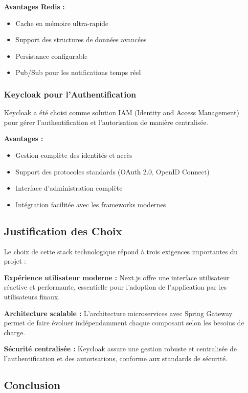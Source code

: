 \textbf{Avantages Redis :}
\begin{itemize}
    \item Cache en mémoire ultra-rapide
    \item Support des structures de données avancées
    \item Persistance configurable
    \item Pub/Sub pour les notifications temps réel
\end{itemize}

\subsubsection{Keycloak pour l'Authentification}

Keycloak a été choisi comme solution IAM (Identity and Access Management) pour gérer l'authentification et l'autorisation de manière centralisée.

\textbf{Avantages :}
\begin{itemize}
    \item Gestion complète des identités et accès
    \item Support des protocoles standards (OAuth 2.0, OpenID Connect)
    \item Interface d'administration complète
    \item Intégration facilitée avec les frameworks modernes
\end{itemize}

\subsection{Justification des Choix}

Le choix de cette stack technologique répond à trois exigences importantes du projet :

\textbf{Expérience utilisateur moderne :} Next.js offre une interface utilisateur réactive et performante, essentielle pour l'adoption de l'application par les utilisateurs finaux.

\textbf{Architecture scalable :} L'architecture microservices avec Spring Gateway permet de faire évoluer indépendamment chaque composant selon les besoins de charge.

\textbf{Sécurité centralisée :} Keycloak assure une gestion robuste et centralisée de l'authentification et des autorisations, conforme aux standards de sécurité.

\subsection{Conclusion}

